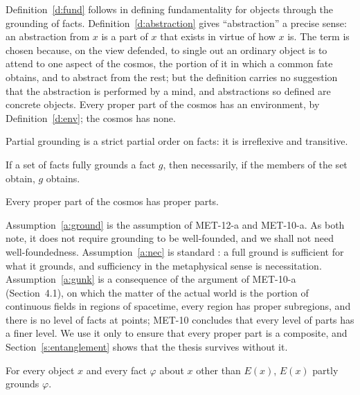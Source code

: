 \documentclass{situationist-preprint}
\begin{document}
Definition~\ref{d:fund} follows \citet{Schaffer2010} in defining fundamentality for objects through the grounding of facts. Definition~\ref{d:abstraction} gives \enquote{abstraction} a precise sense: an abstraction from $x$ is a part of $x$ that exists in virtue of how $x$ is. The term is chosen because, on the view defended, to single out an ordinary object is to attend to one aspect of the cosmos, the portion of it in which a common fate obtains, and to abstract from the rest; but the definition carries no suggestion that the abstraction is performed by a mind, and abstractions so defined are concrete objects. Every proper part of the cosmos has an environment, by Definition~\ref{d:env}; the cosmos has none.

\begin{assumption}[Grounding]\label{a:ground}
Partial grounding is a strict partial order on facts: it is irreflexive and transitive.
\end{assumption}

\begin{assumption}[Necessitation]\label{a:nec}
If a set of facts fully grounds a fact $g$, then necessarily, if the members of the set obtain, $g$ obtains.
\end{assumption}

\begin{assumption}[No simples]\label{a:gunk}
Every proper part of the cosmos has proper parts.
\end{assumption}

Assumption~\ref{a:ground} is the assumption of MET-12-a and MET-10-a. As both note, it does not require grounding to be well-founded, and we shall not need well-foundedness. Assumption~\ref{a:nec} is standard \citep{Rosen2010,Fine2012}: a full ground is sufficient for what it grounds, and sufficiency in the metaphysical sense is necessitation. Assumption~\ref{a:gunk} is a consequence of the argument of MET-10-a (Section~4.1), on which the matter of the actual world is the portion of continuous fields in regions of spacetime, every region has proper subregions, and there is no level of facts at points; MET-10 concludes that every level of parts has a finer level. We use it only to ensure that every proper part is a composite, and Section~\ref{s:entanglement} shows that the thesis survives without it.

\begin{principle}\label{p:exist}
For every object $x$ and every fact $\varphi$ about $x$ other than $E(x)$, $E(x)$ partly grounds $\varphi$.
\end{principle}
\end{document}
